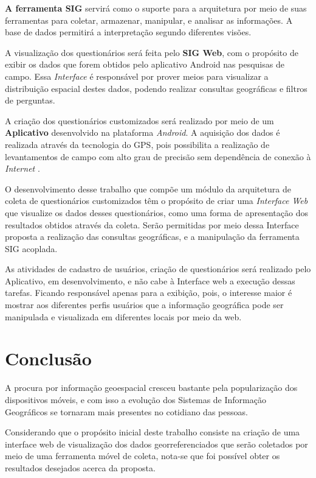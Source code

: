 \documentclass[
	12pt,				%
    oneside,			%
	a4paper,			%
	english,			%
	french,				%
	spanish,			%
	brazil,				%
	]{abntex2}
\begin{document}
\textbf{A ferramenta SIG} servirá como o suporte para a arquitetura por meio de suas ferramentas para coletar, armazenar, manipular, e analisar as informações. A base de dados permitirá a interpretação segundo diferentes visões. 

A visualização dos questionários será feita pelo \textbf{SIG Web}, com o propósito de exibir os dados que forem obtidos pelo aplicativo Android nas pesquisas de campo. Essa \textit{Interface} é responsável por prover meios para visualizar a distribuição espacial destes dados, podendo realizar consultas geográficas e filtros de perguntas.

A criação dos questionários customizados será realizado por meio de um \textbf{Aplicativo} desenvolvido na plataforma \textit{Android}. A aquisição dos dados é realizada através da tecnologia do GPS, pois possibilita a realização de levantamentos de campo com alto grau de precisão sem dependência de conexão à \textit{Internet} .


O desenvolvimento desse trabalho que compõe um módulo da arquitetura de coleta de questionários customizados têm o propósito de criar uma \textit{Interface Web} que visualize os dados desses questionários, como uma forma de apresentação dos resultados obtidos através da coleta. Serão permitidas por meio dessa Interface proposta a realização das consultas geográficas, e a manipulação da ferramenta SIG acoplada.

As atividades de cadastro de usuários, criação de questionários será realizado pelo Aplicativo, em desenvolvimento, e não cabe à Interface web a execução dessas tarefas. Ficando responsável apenas para a exibição, pois, o interesse maior é mostrar aos diferentes perfis usuários que a informação geográfica pode ser manipulada e visualizada em diferentes locais por meio da web.



\chapter{Conclusão}

A procura por informação geoespacial cresceu bastante pela popularização dos dispositivos móveis, e com isso a evolução dos Sistemas de Informação Geográficos se tornaram mais presentes no cotidiano das pessoas.

Considerando que o propósito inicial deste trabalho consiste na criação de uma interface web de visualização dos dados georreferenciados que serão coletados por meio de uma ferramenta móvel de coleta, nota-se que foi possível obter os resultados desejados acerca da proposta.
\end{document}

